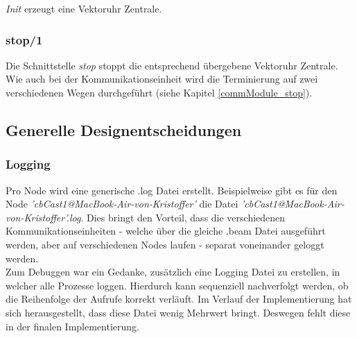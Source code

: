 \textit{Init} erzeugt eine Vektoruhr Zentrale.

\subsubsection{stop/1}

Die Schnittstelle \textit{stop} stoppt die entsprechend übergebene Vektoruhr Zentrale. Wie auch bei der Kommunikationseinheit wird die Terminierung auf zwei verschiedenen Wegen durchgeführt (siehe Kapitel \ref{commModule_stop}).

\subsection{Generelle Designentscheidungen}

\subsubsection{Logging}

Pro Node wird eine generische .log Datei erstellt. Beispielweise gibt es für den Node \textit{'cbCast1@MacBook-Air-von-Kristoffer'} die Datei \textit{'cbCast1@MacBook-Air-von-Kristoffer'.log}. Dies bringt den Vorteil, dass die verschiedenen Kommunikationseinheiten - welche über die gleiche .beam Datei ausgeführt werden, aber auf verschiedenen Nodes laufen - separat voneinander geloggt werden.
\\Zum Debuggen war ein Gedanke, zusätzlich eine Logging Datei zu erstellen, in welcher alle Prozesse loggen. Hierdurch kann sequenziell nachverfolgt werden, ob die Reihenfolge der Aufrufe korrekt verläuft. Im Verlauf der Implementierung hat sich herausgestellt, dass diese Datei wenig Mehrwert bringt. Deswegen fehlt diese in der finalen Implementierung.